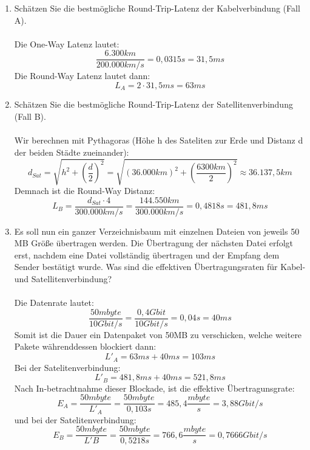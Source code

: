 \documentclass[a4paper]{article}
\begin{document}
\begin{enumerate}[label=\alph*)]
    \item Schätzen Sie die bestmögliche Round-Trip-Latenz der Kabelverbindung (Fall A).\\\\
    Die One-Way Latenz lautet:
    \[
    \frac{6.300 km}{200.000 km/s}=0,0315 s = 31,5 ms
    \]
    Die Round-Way Latenz lautet dann:
    \[
    L_A = 2 \cdot 31,5 ms = 63 ms
    \]
    \item Schätzen Sie die bestmögliche Round-Trip-Latenz der Satellitenverbindung (Fall B).\\\\
    Wir berechnen mit Pythagoras (Höhe h des Sateliten zur Erde und Distanz d der beiden Städte zueinander):
    \[
        d_{Sat}=\sqrt{h^2+\left(\frac{d}{2}\right)^2}=\sqrt{(36.000km)^2+\left(\frac{6300km}{2}\right)^2}\approx36.137,5 km
    \]
    Demnach ist die Round-Way Distanz:
    \[
    L_B=\frac{d_{Sat}\cdot 4}{300.000km/s}=\frac{144.550 km}{300.000km/s}=0,4818 s = 481,8 ms
    \]
    \item Es soll nun ein ganzer Verzeichnisbaum mit einzelnen Dateien von jeweils 50 MB Größe übertragen werden. Die Übertragung der nächsten Datei erfolgt erst, nachdem eine Datei vollständig übertragen und der Empfang dem Sender bestätigt wurde. Was sind die effektiven Übertragungsraten für Kabel- und Satellitenverbindung?\\\\
    Die Datenrate lautet:
    \[
    \frac{50 mbyte}{10 Gbit/s}=\frac{0,4Gbit}{10 Gbit/s}=0,04 s = 40 ms
    \]
    Somit ist die Dauer ein Datenpaket von 50MB zu verschicken, welche weitere Pakete währenddessen blockiert dann:
    \[
    L'_A=63 ms + 40 ms = 103 ms
    \]
    Bei der Satelitenverbindung:
    \[
    L'_B=481,8 ms + 40 ms = 521,8 ms
    \]
    Nach In-betrachtnahme dieser Blockade, ist die effektive Übertragunsgrate:
    \[
    E_A=\frac{50 mbyte}{L'_A}=\frac{50 mbyte}{0,103 s}=485,4 \frac{mbyte}{s}=3,88 Gbit/s
    \]
    und bei der Satelitenverbindung:
    \[
    E_B=\frac{50 mbyte}{L'B}=\frac{50 mbyte}{0,5218 s}=766,6\frac{mbyte}{s}=0,7666 Gbit/s
    \]
\end{enumerate}
\end{document}
